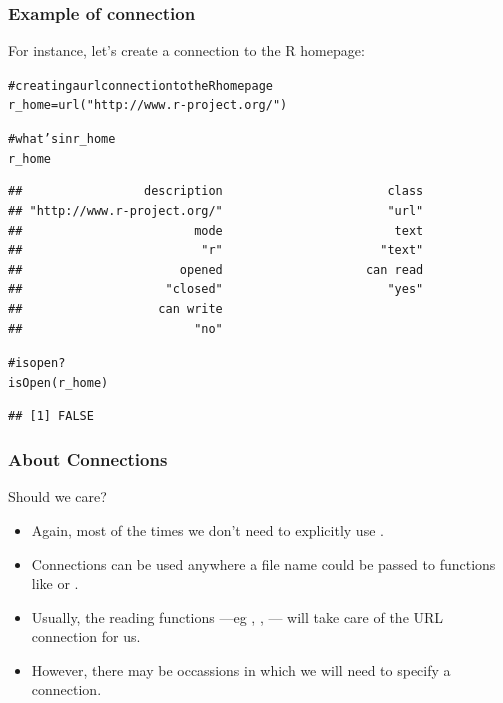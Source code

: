 \documentclass{beamer}\usepackage[]{graphicx}\usepackage[]{color}
\makeatletter
\newcommand{\hlstr}[1]{\textcolor[rgb]{0.063,0.58,0.627}{#1}}%
\newcommand{\hlcom}[1]{\textcolor[rgb]{0.588,0.588,0.588}{#1}}%
\newcommand{\hlstd}[1]{\textcolor[rgb]{0.196,0.196,0.196}{#1}}%
\newcommand{\hlkwb}[1]{\textcolor[rgb]{0.627,0,0.314}{#1}}%
\newcommand{\hlkwd}[1]{\textcolor[rgb]{0.78,0.227,0.412}{#1}}%
\newenvironment{kframe}{%
 \def\at@end@of@kframe{}%
 \ifinner\ifhmode%
  \def\at@end@of@kframe{\end{minipage}}%
  \begin{minipage}{\columnwidth}%
 \fi\fi%
 \def\FrameCommand##1{\hskip\@totalleftmargin \hskip-\fboxsep
 \colorbox{shadecolor}{##1}\hskip-\fboxsep
     \hskip-\linewidth \hskip-\@totalleftmargin \hskip\columnwidth}%
 \MakeFramed {\advance\hsize-\width
   \@totalleftmargin\z@ \linewidth\hsize
   \@setminipage}}%
 {\par\unskip\endMakeFramed%
 \at@end@of@kframe}
\newenvironment{knitrout}{}{} %
\makeatother
\begin{document}
\begin{frame}[fragile]
\frametitle{Example of  connection}

For instance, let's create a connection to the R homepage:
\begin{knitrout}\tiny
{}\color{fgcolor}\begin{kframe}
\begin{alltt}
\hlcom{# creating a url connection to the R homepage}
\hlstd{r_home} \hlkwb{=} \hlkwd{url}\hlstd{(}\hlstr{"http://www.r-project.org/"}\hlstd{)}

\hlcom{# what's in r_home}
\hlstd{r_home}
\end{alltt}
\begin{verbatim}
##                 description                       class 
## "http://www.r-project.org/"                       "url" 
##                        mode                        text 
##                         "r"                      "text" 
##                      opened                    can read 
##                    "closed"                       "yes" 
##                   can write 
##                        "no"
\end{verbatim}
\begin{alltt}
\hlcom{# is open?}
\hlkwd{isOpen}\hlstd{(r_home)}
\end{alltt}
\begin{verbatim}
## [1] FALSE
\end{verbatim}
\end{kframe}
\end{knitrout}

{\scriptsize {}}

\end{frame}


\begin{frame}
\frametitle{About Connections}

\begin{block}{Should we care?}
 \begin{itemize}
  \item Again, most of the times we don't need to explicitly use . 
  \item Connections can be used anywhere a file name could be passed to functions like  or . 
  \item Usually, the reading functions ---eg , , --- will take care of the URL connection for us.
  \item However, there may be occassions in which we will need to specify a  connection.
 \end{itemize}
\end{block}

\end{frame}
\end{document}
